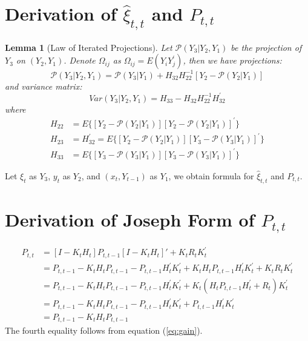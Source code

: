 \documentclass[12pt]{article}
\newtheorem{lemma}{Lemma}
\numberwithin{equation}{section}
\begin{document}
\section{Derivation of $\hat{\xi}_{t,t}$ and $P_{t,t}$} \label{ap:iter_proj}
\begin{lemma}[Law of Iterated Projections] \label{lem:1}
    Let $\mathcal{P}(Y_3|Y_2,Y_1)$ be the projection of $Y_3$ on $(Y_2, Y_1)$. Denote $\Omega_{ij}$ as $\Omega_{ij} = E(Y_iY_j^{'})$, then we have projections:
    \[
        \mathcal{P}(Y_3|Y_2,Y_1) = \mathcal{P}(Y_3|Y_1)+H_{32}H_{22}^{-1}[Y_2 - \mathcal{P}(Y_2|Y_1)]
    \]
    and variance matrix:
    \[
        Var(Y_3|Y_2,Y_1) = H_{33} - H_{32}H_{22}^{-1}H_{32}^{'}
    \]
    where 
    \begin{align*}
        H_{22} &= E\{[Y_2-\mathcal{P}(Y_2|Y_1)][Y_2-\mathcal{P}(Y_2|Y_1)]^{'}\} \\
        H_{23} &= H_{32}^{'} = E\{[Y_2-\mathcal{P}(Y_2|Y_1)][Y_3-\mathcal{P}(Y_3|Y_1)]^{'}\} \\
        H_{33} &= E\{[Y_3-\mathcal{P}(Y_3|Y_1)][Y_3-\mathcal{P}(Y_3|Y_1)]^{'}\}
    \end{align*}
\end{lemma}

Let $\xi_t$ as $Y_3$, $y_t$ as $Y_2$, and $(x_t,Y_{t-1})$ as $Y_1$, we obtain formula for $\hat{\xi}_{t,t}$ and $P_{t,t}$.

\section{Derivation of Joseph Form of $P_{t,t}$} \label{ap:joseph}
\begin{align*}
    P_{t,t} &= [I - K_tH_t]P_{t,t-1}[I - K_tH_t]' + K_tR_tK_t^{'} \\
    &= P_{t,t-1} - K_tH_tP_{t,t-1} - P_{t,t-1}H_t^{'}K_t^{'} + K_tH_tP_{t,t-1}H_t^{'}K_t^{'} + K_tR_tK_t^{'} \\
    &= P_{t,t-1} - K_tH_tP_{t,t-1} - P_{t,t-1}H_t^{'}K_t^{'} + K_t(H_tP_{t,t-1}H_t^{'} + R_t)K_t^{'} \\
    &= P_{t,t-1} - K_tH_tP_{t,t-1} - P_{t,t-1}H_t^{'}K_t^{'} + P_{t,t-1}H_t^{'}K_t^{'} \\
    &= P_{t,t-1} - K_tH_tP_{t,t-1}
\end{align*}
The fourth equality follows from equation (\ref{eq:gain}).
\end{document}
